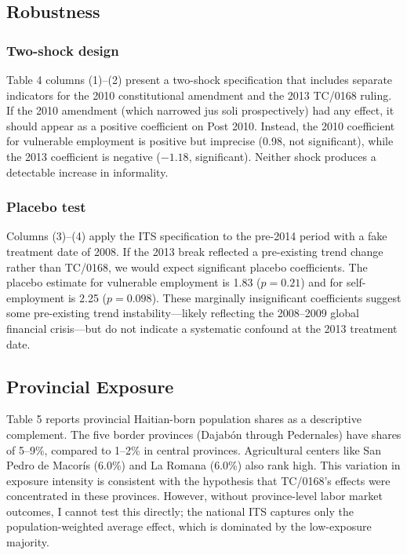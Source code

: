 \documentclass[12pt]{article}
\begin{document}
\subsection{Robustness}



\subsubsection*{Two-shock design}
Table 4 columns (1)--(2) present a two-shock specification that includes separate indicators for the 2010 constitutional amendment and the 2013 TC/0168 ruling. If the 2010 amendment (which narrowed jus soli prospectively) had any effect, it should appear as a positive coefficient on Post 2010. Instead, the 2010 coefficient for vulnerable employment is positive but imprecise (0.98, not significant), while the 2013 coefficient is negative ($-1.18$, significant). Neither shock produces a detectable increase in informality.

\subsubsection*{Placebo test}
Columns (3)--(4) apply the ITS specification to the pre-2014 period with a fake treatment date of 2008. If the 2013 break reflected a pre-existing trend change rather than TC/0168, we would expect significant placebo coefficients. The placebo estimate for vulnerable employment is 1.83 ($p = 0.21$) and for self-employment is 2.25 ($p = 0.098$). These marginally insignificant coefficients suggest some pre-existing trend instability---likely reflecting the 2008--2009 global financial crisis---but do not indicate a systematic confound at the 2013 treatment date.

\subsection{Provincial Exposure}



Table 5 reports provincial Haitian-born population shares as a descriptive complement. The five border provinces (Dajab\'{o}n through Pedernales) have shares of 5--9\%, compared to 1--2\% in central provinces. Agricultural centers like San Pedro de Macor\'{i}s (6.0\%) and La Romana (6.0\%) also rank high. This variation in exposure intensity is consistent with the hypothesis that TC/0168's effects were concentrated in these provinces. However, without province-level labor market outcomes, I cannot test this directly; the national ITS captures only the population-weighted average effect, which is dominated by the low-exposure majority.
\end{document}
